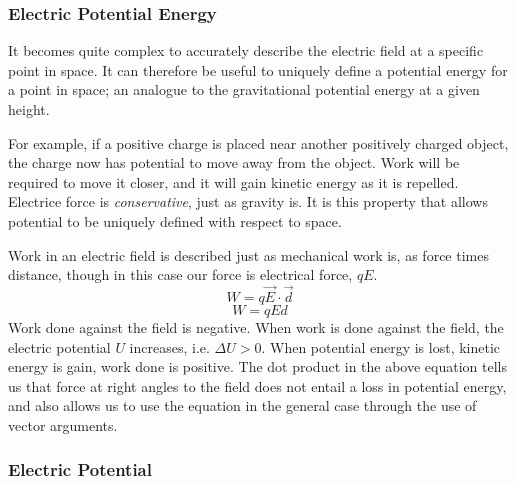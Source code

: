 \documentclass[12pt]{report}
\begin{document}
\begin{flushleft}
\subsubsection*{Electric Potential Energy}
It becomes quite complex to accurately describe the electric field at a 
specific point in space. It can therefore be useful to uniquely define a 
potential energy for a point in space; an analogue to the gravitational 
potential energy at a given height. \par
For example, if a positive charge is placed near another positively charged
object, the charge now has potential to move away from the object. Work will be
required to move it closer, and it will gain kinetic energy as it is repelled.
Electrice force is \textit{conservative}, just as gravity is. It is this 
property that allows potential to be uniquely defined with respect to space.

\bigskip
Work in an electric field is described just as mechanical work is, as force
times distance, though in this case our force is electrical force, \(qE\).
\[W = q\vec{E}\cdot\vec{d}\]
\[W = qEd\]
Work done against the field is negative. When work is done against the field,
the electric potential \(U\) increases, i.e. \(\Delta U > 0\). When potential
energy is lost, kinetic energy is gain, work done is positive. The dot product
in the above equation tells us that force at right angles to the field does
not entail a loss in potential energy, and also allows us to use the equation
in the general case through the use of vector arguments.

\subsubsection*{Electric Potential}


\end{flushleft}
\end{document}
